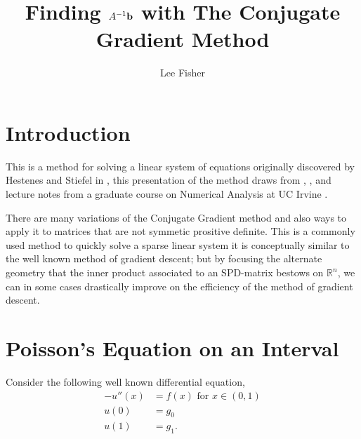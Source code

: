 \documentclass{article}
\title{Finding $A^{-1}{\bf b}$ with The Conjugate Gradient Method}
\author{Lee Fisher}
\theoremstyle{remark}
\begin{document}
\maketitle
{}

\section{Introduction}

This is a method for solving a linear system of equations originally discovered by Hestenes and Stiefel in \cite{hest52}, this presentation of the method draws from \cite{KelleyCT}, \cite{GreenbaumA}, and lecture notes from a graduate course on Numerical Analysis at UC Irvine \cite{lchen}.

There are many variations of the Conjugate Gradient method and also ways to apply it to matrices that are not symmetic prositive definite. This is a commonly used method to quickly solve a sparse linear system it is conceptually similar to the well known method of gradient descent; but by focusing the alternate geometry that the inner product associated to an SPD-matrix bestows on $\mathbb{R}^n$, we can in some cases drastically improve on the efficiency of the method of gradient descent. 



\section{Poisson's Equation on an Interval}

Consider the following well known differential equation,
\begin{align}
\label{eq:p1d}
-u''(x) &= f(x) \text{ for } x\in (0,1)\\ \nonumber
u(0) &= g_0\\ \nonumber
u(1) &= g_1.
\end{align}
\end{document}
